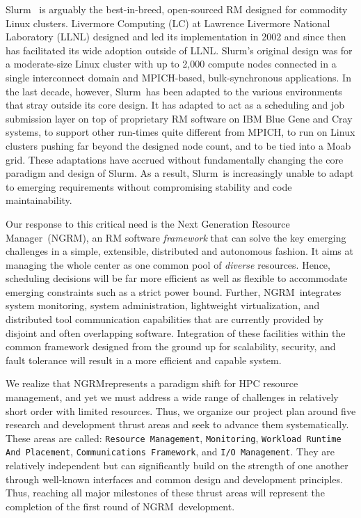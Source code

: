 \documentclass[10pt]{article}
\newcommand{\ngrm}{NGRM}
\newcommand{\ngrmfull}{Next Generation Resource Manager}
\newcommand{\slurm}{Slurm}
\newcommand{\moab}{Moab}
\begin{document}
\slurm~\cite{SlurmDesign} is arguably the
best-in-breed, open-sourced RM designed for commodity Linux clusters.
Livermore Computing (LC) at Lawrence Livermore National Laboratory (LLNL)
designed and led its implementation in 2002 and since then has facilitated
its wide adoption outside of LLNL.
\slurm's original design was for a moderate-size Linux cluster with up to 2,000 
compute nodes connected in a single interconnect domain and MPICH-based, 
bulk-synchronous applications.
In the last decade, however, \slurm\ has been adapted to the various
environments that stray outside its core design.
It has adapted to act as a scheduling and job submission layer
on top of proprietary RM software on IBM Blue Gene and Cray systems,
to support other run-times quite different from MPICH,
to run on Linux clusters pushing far beyond the designed node count,
and to be tied into a \moab~\cite{MOAB:online} grid.
These adaptations have accrued without fundamentally changing the
core paradigm and design of \slurm. As a result, \slurm\ is increasingly
unable to adapt to emerging requirements without compromising
stability and code maintainability.

Our response to this critical need is the \ngrmfull\ (\ngrm ), an RM software
{\em framework} that can solve the key emerging challenges 
in a simple, extensible, distributed and autonomous fashion.
It aims at managing the whole center as one common pool of {\em diverse} 
resources. Hence, scheduling decisions will be 
far more efficient as well as flexible to accommodate 
emerging constraints such as a strict power bound. 
Further, \ngrm\ integrates
system monitoring, system administration, lightweight
virtualization, and distributed tool communication capabilities
that are currently provided by disjoint and often overlapping software.
Integration of these facilities within the common framework designed from
the ground up for scalability, security, and fault tolerance will result
in a more efficient and capable system.

We realize that \ngrm represents a paradigm shift for HPC resource management, 
and yet we must address a wide range of challenges in relatively short order
with limited resources. Thus, we 
organize our project plan around five research and development thrust areas 
and seek to advance them systematically.
These areas are called:
{\tt Resource Management},
{\tt Monitoring},
{\tt Workload Runtime And Placement}, 
{\tt Communications Framework}, and
{\tt I/O Management}.
They are relatively independent but can significantly build on the
strength of one another through well-known interfaces and common design
and development principles.
Thus, reaching all major milestones of these thrust areas 
will represent the completion of the first round of \ngrm\ development. 
\end{document}
